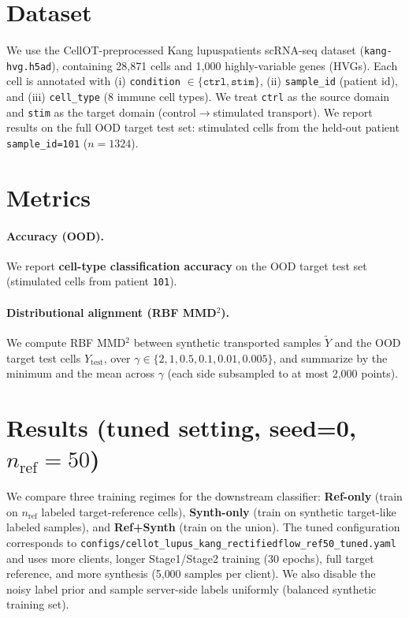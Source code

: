 \section{Dataset}
We use the CellOT-preprocessed Kang lupuspatients scRNA-seq dataset (\texttt{kang-hvg.h5ad}), containing 28{,}871 cells and 1{,}000 highly-variable genes (HVGs). Each cell is annotated with (i) \texttt{condition} $\in \{\texttt{ctrl},\texttt{stim}\}$, (ii) \texttt{sample\_id} (patient id), and (iii) \texttt{cell\_type} (8 immune cell types). We treat \texttt{ctrl} as the source domain and \texttt{stim} as the target domain (control$\rightarrow$stimulated transport). We report results on the full OOD target test set: stimulated cells from the held-out patient \texttt{sample\_id=101} ($n=1324$).

\section{Metrics}
\paragraph{Accuracy (OOD).}
We report \textbf{cell-type classification accuracy} on the OOD target test set (stimulated cells from patient \texttt{101}).

\paragraph{Distributional alignment (RBF MMD$^2$).}
We compute RBF MMD$^2$ between synthetic transported samples $\tilde{Y}$ and the OOD target test cells $Y_{\text{test}}$, over $\gamma \in \{2,1,0.5,0.1,0.01,0.005\}$, and summarize by the minimum and the mean across $\gamma$ (each side subsampled to at most 2{,}000 points).

\section{Results (tuned setting, seed=0, $n_{\text{ref}}=50$)}
We compare three training regimes for the downstream classifier:
\textbf{Ref-only} (train on $n_{\text{ref}}$ labeled target-reference cells),
\textbf{Synth-only} (train on synthetic target-like labeled samples),
and \textbf{Ref+Synth} (train on the union).
The tuned configuration corresponds to \texttt{configs/cellot\_lupus\_kang\_rectifiedflow\_ref50\_tuned.yaml} and uses more clients, longer Stage1/Stage2 training (30 epochs), full target reference, and more synthesis (5{,}000 samples per client). We also disable the noisy label prior and sample server-side labels uniformly (balanced synthetic training set).

